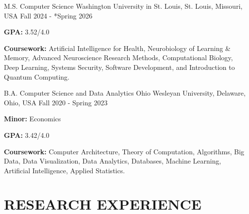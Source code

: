 \documentclass[10pt, letterpaper]{article}
\begin{document}
\begin{educationentry}
    {M.S. Computer Science} %
    {Washington University in St. Louis, St. Louis, Missouri, USA} %
    {Fall 2024 - *Spring 2026} %
    \item \textbf{GPA:} 3.52/4.0
    \item \textbf{Coursework:}  Artificial Intelligence for Health, Neurobiology of Learning \& Memory, Advanced Neuroscience Research Methods, Computational Biology, Deep Learning, Systems Security, Software Development, and Introduction to Quantum Computing.
\end{educationentry}

\begin{educationentry}
    {B.A. Computer Science and Data Analytics} %
    {Ohio Wesleyan University, Delaware, Ohio, USA} %
    {Fall 2020 - Spring 2023} %
    \item \textbf{Minor:} Economics
    \item \textbf{GPA:} 3.42/4.0
    \item \textbf{Coursework:} Computer Architecture, Theory of Computation, Algorithms, Big Data, Data Visualization, Data Analytics, Databases, Machine Learning, Artificial Intelligence, Applied Statistics.
\end{educationentry}

\vspace{\headerSpacing}

\section{RESEARCH EXPERIENCE}
\end{document}

